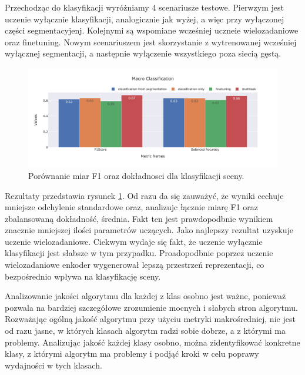 \vspace{0.5cm}
Przechodząc do klasyfikacji wyróżniamy 4 scenariusze testowe. Pierwzym jest uczenie wyłącznie klasyfikacji, analogicznie jak wyżej, a więc przy wyłączonej części segmentacyjenj. Kolejnymi są wspomiane wcześniej uczneie wielozadaniowe oraz finetuning. Nowym scenariuszem jest skorzystanie z wytrenowanej wcześniej wyłącznej segmentacji, a następnie wyłączenie wszystkiego poza siecią gęstą.
\begin{figure}[ht!]
    \centering
    \includegraphics[width=\textwidth]{result_imgs_sorted/Macro-Classification.jpeg}
    \caption{Porównanie miar F1 oraz dokładnosci dla klasyfikacji sceny.}
    \label{fig:macro-classification}
\end{figure}

Rezultaty przedstawia rysunek \ref{fig:macro-classification}. Od razu da się zauważyć, że wyniki cechuje mniejsze odchylenie standardowe oraz,  analizujc łącznie miarę F1 oraz zbalansowaną dokładność, średnia. Fakt ten jest prawdopodbnie wynikiem znacznie mniejszej ilości parametrów uczących. Jako najlepszy rezultat uzyskuje uczenie wielozadaniowe. Ciekwym wydaje się fakt, że uczenie wyłącznie klasyfikacji jest słabsze w tym przypadku. Proadopodbnie poprzez uczenie wielozadaniowe enkoder wygenerował lepszą przestrzeń reprezentacji, co bezpośrednio wpływa na klasyfikację sceny.

\vspace{0.5cm}

Analizowanie jakości algorytmu dla każdej z klas osobno jest ważne, ponieważ pozwala na bardziej szczegółowe zrozumienie mocnych i słabych stron algorytmu. Rozważając ogólną jakość algorytmu przy użyciu metryki makrośredniej, nie jest od razu jasne, w których klasach algorytm radzi sobie dobrze, a z którymi ma problemy. Analizując jakość każdej klasy osobno, można zidentyfikować konkretne klasy, z którymi algorytm ma problemy i podjąć kroki w celu poprawy wydajności w tych klasach.


